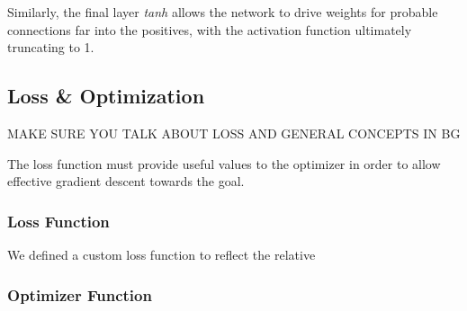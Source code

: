 Similarly, the final layer \textit{tanh} allows the network to drive weights for 
probable connections far into the positives, with the activation function 
ultimately truncating to 1.

\subsection{Loss \& Optimization}
MAKE SURE YOU TALK ABOUT LOSS AND GENERAL CONCEPTS IN BG

The loss function must provide useful values to the optimizer in order to allow 
effective gradient descent towards the goal.

\subsubsection{Loss Function}
We defined a custom loss function to reflect the relative 


\subsubsection{Optimizer Function}
